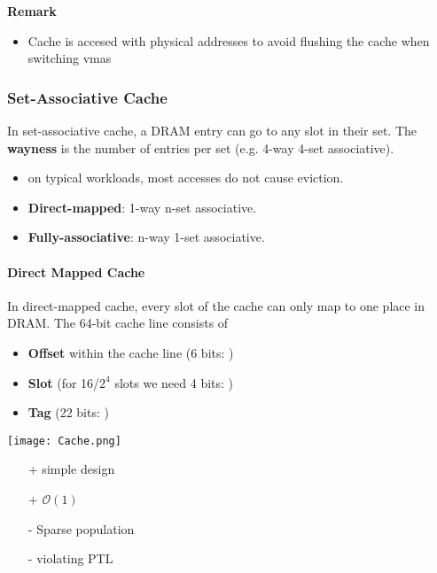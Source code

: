 \newpar{}
\textbf{Remark}
\begin{itemize}
    \item Cache is accesed with physical addresses to avoid flushing the cache when switching vmas
\end{itemize}

\subsubsection{Set-Associative Cache}
In set-associative cache, a DRAM entry can go to any slot in their set. The \textbf{wayness} is the number of entries per set (e.g. 4-way 4-set associative).

\newpar{}
\begin{itemize}
    \item on typical workloads, most accesses do not cause eviction.
\end{itemize}

\begin{itemize}
    \item \textbf{Direct-mapped}: 1-way n-set associative.
    \item \textbf{Fully-associative}: n-way 1-set associative.
\end{itemize}

\paragraph{Direct Mapped Cache}
In direct-mapped cache, every slot of the cache can only map to one place in DRAM.
\newpar{}
The 64-bit cache line consists of
\begin{itemize}
    \item \textbf{Offset} within the cache line (6 bits: )
    \item \textbf{Slot} (for 16/$2^4$ slots we need 4 bits: )
    \item \textbf{Tag} (22 bits: )
\end{itemize}
\texttt{[image: Cache.png]}

\newpar{}
\begin{itemize}
    \item[+] simple design
    \item[+] $\mathcal{O}(1)$
    \item[-] Sparse population
    \item[-] violating PTL
\end{itemize}

